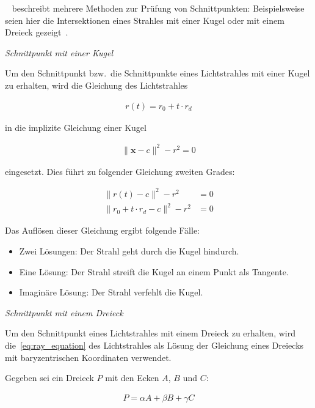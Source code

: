 ~\citeauthor{glassner_introduction_1989} beschreibt mehrere Methoden zur
Prüfung von Schnittpunkten: Beispielsweise seien hier die Intersektionen
eines Strahles mit einer Kugel oder mit einem Dreieck
gezeigt~\parencite[S. 35 bis 64]{glassner_introduction_1989}.

\textit{Schnittpunkt mit einer Kugel}

Um den Schnittpunkt bzw.\ die Schnittpunkte eines Lichtstrahles mit
einer Kugel zu erhalten, wird die Gleichung des Lichtstrahles

\begin{gather}\label{eq:ray_equation}
    r(t) = r_{0} + t \cdot r_{d}
\end{gather}

in die implizite Gleichung einer Kugel

\begin{gather}
    \|\bm{x} - c\|^{2} - r^{2} = 0
\end{gather}

eingesetzt. Dies führt zu folgender Gleichung zweiten Grades:

\begin{align}
    \|r(t) - c\|^{2} - r^{2} &= 0 \\
    \|r_{0} + t \cdot r_{d} - c\|^{2} - r^{2} &= 0
\end{align}

Das Auflösen dieser Gleichung ergibt folgende Fälle:

\begin{itemize}
    \item{Zwei Lösungen}: Der Strahl geht durch die Kugel hindurch.
    \item{Eine Lösung}: Der Strahl streift die Kugel an einem Punkt als
        Tangente.
    \item{Imaginäre Lösung}: Der Strahl verfehlt die Kugel.
\end{itemize}


\textit{Schnittpunkt mit einem Dreieck}

Um den Schnittpunkt eines Lichtstrahles mit einem Dreieck zu erhalten,
wird die~\autoref{eq:ray_equation} des Lichtstrahles als Lösung der
Gleichung eines Dreiecks mit baryzentrischen Koordinaten verwendet.

Gegeben sei ein Dreieck $P$ mit den Ecken $A$, $B$ und $C$:

\begin{gather}
    P = \alpha{A} + \beta{B} + \gamma{C}
\end{gather}

